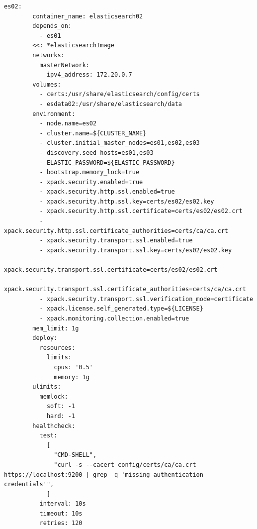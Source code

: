 \begin{lstlisting}[caption=Plik docker-comose.yml, label=dockerComposeFile]
      es02:
        container_name: elasticsearch02
        depends_on:
          - es01
        <<: *elasticsearchImage
        networks:
          masterNetwork:
            ipv4_address: 172.20.0.7
        volumes:
          - certs:/usr/share/elasticsearch/config/certs
          - esdata02:/usr/share/elasticsearch/data
        environment:
          - node.name=es02
          - cluster.name=${CLUSTER_NAME}
          - cluster.initial_master_nodes=es01,es02,es03
          - discovery.seed_hosts=es01,es03
          - ELASTIC_PASSWORD=${ELASTIC_PASSWORD}
          - bootstrap.memory_lock=true
          - xpack.security.enabled=true
          - xpack.security.http.ssl.enabled=true
          - xpack.security.http.ssl.key=certs/es02/es02.key
          - xpack.security.http.ssl.certificate=certs/es02/es02.crt
          - xpack.security.http.ssl.certificate_authorities=certs/ca/ca.crt
          - xpack.security.transport.ssl.enabled=true
          - xpack.security.transport.ssl.key=certs/es02/es02.key
          - xpack.security.transport.ssl.certificate=certs/es02/es02.crt
          - xpack.security.transport.ssl.certificate_authorities=certs/ca/ca.crt
          - xpack.security.transport.ssl.verification_mode=certificate
          - xpack.license.self_generated.type=${LICENSE}
          - xpack.monitoring.collection.enabled=true
        mem_limit: 1g
        deploy:
          resources:
            limits:
              cpus: '0.5'
              memory: 1g
        ulimits:
          memlock:
            soft: -1
            hard: -1
        healthcheck:
          test:
            [
              "CMD-SHELL",
              "curl -s --cacert config/certs/ca/ca.crt https://localhost:9200 | grep -q 'missing authentication credentials'",
            ]
          interval: 10s
          timeout: 10s
          retries: 120
    

\end{lstlisting}
